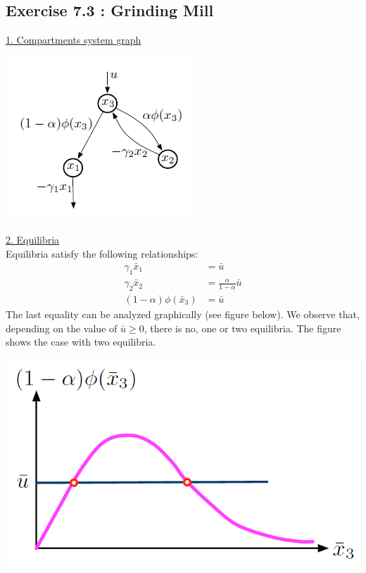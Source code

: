 \subsection*{Exercise 7.3 : Grinding Mill}
\underline{1. Compartments
system graph}

{\centering
\includegraphics[scale=0.7]{Graphe7_3_1}
\label{Graphe7_3_1}

}

\underline{2. Equilibria} \\
Equilibria satisfy the following relationships:
\begin{align*}
\gamma_1\bar{x}_1 &= \bar{u} \\
\gamma_2\bar{x}_2 &= \frac{\alpha }{1-\alpha }\bar{u} \\
(1-\alpha )\phi (\bar{x}_3) &= \bar{u}
\end{align*}
The last equality can be analyzed graphically (see figure below). We observe that, depending on the value of $\bar{u}\geq 0$, there is no, one or two equilibria. The figure shows the case with two equilibria.

{\centering
\includegraphics[scale=0.3]{Graphe7_3_2}
\label{Graphe7_3_2}

}

